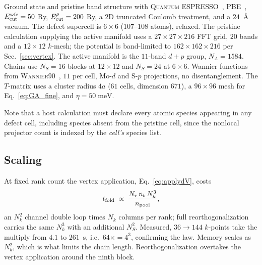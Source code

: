 \documentclass[aps,prx,reprint,superscriptaddress,nofootinbib,longbibliography]{revtex4-2}
\newcommand{\meV}{\;\mathrm{meV}}
\begin{document}
Ground state and pristine band structure with
\textsc{Quantum ESPRESSO}~\cite{QE2009,QE2017}, PBE~\cite{PBE1996},
$E_{\rm cut}^{\rm wfc} = 50$ Ry, $E_{\rm cut}^{\rho} = 200$ Ry, a $2$D
truncated Coulomb treatment, and a $24$~\AA{} vacuum. The defect supercell is
$6\times6$ ($107$--$108$ atoms), relaxed. The pristine calculation supplying the
active manifold uses a $27\times27\times216$ FFT grid, $20$ bands and a
$12\times12$ $k$-mesh; the potential is band-limited to
$162\times162\times216$ per Sec.~\ref{sec:vertex}. The active manifold is the
$11$-band $d+p$ group, $N_A = 1584$. Chains use $N_S = 16$ blocks at
$12\times12$ and $N_S = 24$ at $6\times6$. Wannier functions from
\textsc{Wannier90}~\cite{Wannier90}, $11$ per cell, Mo-$d$ and S-$p$
projections, no disentanglement. The $T$-matrix uses a cluster radius $4a$
($61$ cells, dimension $671$), a $96\times96$ mesh for
Eq.~\eqref{eq:GA_fine}, and $\eta = 50\meV$.

Note that a host calculation must declare every atomic species appearing in any
defect cell, including species absent from the pristine cell, since the
nonlocal projector count is indexed by the \emph{cell's} species list.

\subsection{Scaling}

At fixed rank count the vertex application, Eq.~\eqref{eq:applydV}, costs
\begin{equation}
  t_{\rm fold} \;\propto\; \frac{N_r\, n_b\, N_k^{3}}{n_{\rm pool}},
\end{equation}
an $N_k^2$ channel double loop times $N_k$ columns per rank; full
reorthogonalization carries the same $N_k^3$ with an additional $N_S^2$.
Measured, $36 \to 144$ $k$-points take the multiply from $4.1$ to $261$~s,
i.e.\ $64\times = 4^3$, confirming the law. Memory scales as $N_k^2$, which is
what limits the chain length. Reorthogonalization overtakes the vertex
application around the ninth block.
\end{document}
